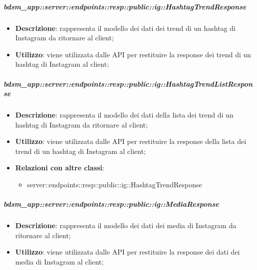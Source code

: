     \subparagraph{bdsm\_app::server::endpoints::resp::public::ig::HashtagTrendResponse} %
    \label{subp:bdsm_app_server_endpoints_resp_public_ig_hashtagtrendresponse}
    \begin{itemize}
      \item \textbf{Descrizione}: rappresenta il modello dei dati dei trend di un hashtag di Instagram da ritornare al client;
      \item \textbf{Utilizzo}: viene utilizzata dalle API per restituire la response dei trend di un hashtag di Instagram al client;
      \end{itemize}

    \subparagraph{bdsm\_app::server::endpoints::resp::public::ig::HashtagTrendListResponse} %
    \label{subp:bdsm_app_server_endpoints_resp_public_ig_hashtagtrendlistresponse}
    \begin{itemize}
      \item \textbf{Descrizione}: rappresenta il modello dei dati della lista dei trend di un hashtag di Instagram da ritornare al client;
      \item \textbf{Utilizzo}: viene utilizzata dalle API per restituire la response della lista dei trend di un hashtag di Instagram al client;
      \item \textbf{Relazioni con altre classi}:
        \begin{itemize}
          \item server::endpoints::resp::public::ig::HashtagTrendResponse
        \end{itemize}
      \end{itemize}

    \subparagraph{bdsm\_app::server::endpoints::resp::public::ig::MediaResponse} %
    \label{subp:bdsm_app_server_endpoints_resp_public_ig_mediaresponse}
    \begin{itemize}
      \item \textbf{Descrizione}: rappresenta il modello dei dati dei media di Instagram da ritornare al client;
      \item \textbf{Utilizzo}: viene utilizzata dalle API per restituire la response dei dati dei media di Instagram al client;
      \end{itemize}

